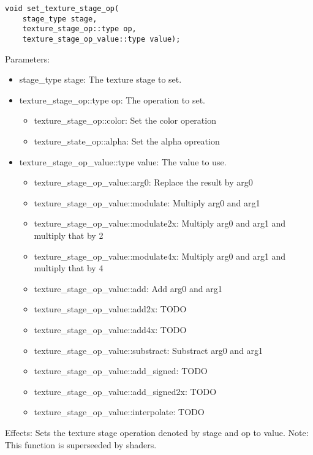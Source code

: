 \documentclass{article}
\begin{document}
\begin{lstlisting}
void set_texture_stage_op(
	stage_type stage,
	texture_stage_op::type op,
	texture_stage_op_value::type value);
\end{lstlisting}
Parameters:
\begin{itemize}
\item stage\_type stage: The texture stage to set.
\item texture\_stage\_op::type op: The operation to set.
  \begin{itemize}
  \item texture\_stage\_op::color: Set the color operation
  \item texture\_state\_op::alpha: Set the alpha opreation
  \end{itemize}
\item texture\_stage\_op\_value::type value: The value to use.
  \begin{itemize}
  \item texture\_stage\_op\_value::arg0: Replace the result by arg0
  \item texture\_stage\_op\_value::modulate: Multiply arg0 and arg1
  \item texture\_stage\_op\_value::modulate2x: Multiply arg0 and arg1 and multiply that by 2
  \item texture\_stage\_op\_value::modulate4x: Multiply arg0 and arg1 and multiply that by 4
  \item texture\_stage\_op\_value::add: Add arg0 and arg1
  \item texture\_stage\_op\_value::add2x: TODO
  \item texture\_stage\_op\_value::add4x: TODO
  \item texture\_stage\_op\_value::substract: Substract arg0 and arg1
  \item texture\_stage\_op\_value::add\_signed: TODO
  \item texture\_stage\_op\_value::add\_signed2x: TODO
  \item texture\_stage\_op\_value::interpolate: TODO
  \end{itemize}
\end{itemize}
Effects: Sets the texture stage operation denoted by stage and op to value.
Note: This function is superseeded by shaders.

\end{document}
